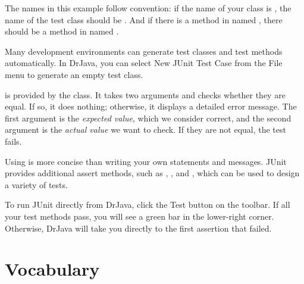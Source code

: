 The names in this example follow convention: if the name of your class is , the name of the test class should be .
And if there is a method in  named , there should be a method in  named .

Many development environments can generate test classes and test methods automatically.
In DrJava, you can select {\sf New JUnit Test Case} from the {\sf File} menu to generate an empty test class.

 is provided by the  class.
It takes two arguments and checks whether they are equal.
If so, it does nothing; otherwise, it displays a detailed error message.
The first argument is the {\em expected value}, which we consider correct, and the second argument is the {\em actual value} we want to check.
If they are not equal, the test fails.


Using  is more concise than writing your own  statements and  messages.
JUnit provides additional assert methods, such as , , and , which can be used to design a variety of tests.

To run JUnit directly from DrJava, click the {\sf Test} button on the toolbar.
If all your test methods pass, you will see a green bar in the lower-right corner.
Otherwise, DrJava will take you directly to the first assertion that failed.


\section{Vocabulary}
\label{tools_vocabulary}

